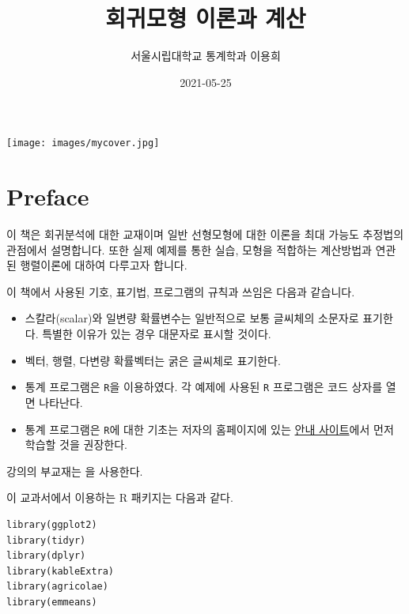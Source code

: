 \documentclass[
  10pt,
]{book}
\title{회귀모형 이론과 계산}
\author{서울시립대학교 통계학과 이용희}
\date{2021-05-25}
\makeatletter
\providecommand{\tightlist}{%
  \setlength{\itemsep}{0pt}\setlength{\parskip}{0pt}}
\newenvironment{kframe}{%
\medskip{}
\setlength{\fboxsep}{.8em}
 \def\at@end@of@kframe{}%
 \ifinner\ifhmode%
  \def\at@end@of@kframe{\end{minipage}}%
  \begin{minipage}{\columnwidth}%
 \fi\fi%
 \def\FrameCommand##1{\hskip\@totalleftmargin \hskip-\fboxsep
 \colorbox{shadecolor}{##1}\hskip-\fboxsep
     \hskip-\linewidth \hskip-\@totalleftmargin \hskip\columnwidth}%
 \MakeFramed {\advance\hsize-\width
   \@totalleftmargin\z@ \linewidth\hsize
   \@setminipage}}%
 {\par\unskip\endMakeFramed%
 \at@end@of@kframe}
\newenvironment{rmdblock}[1]
  {
  \begin{itemize}
  \renewcommand{\labelitemi}{
    \raisebox{-.7\height}[0pt][0pt]{
      {\setkeys{Gin}{width=3em,keepaspectratio}\texttt{[image: images/\#1]}}
    }
  }
  \setlength{\fboxsep}{1em}
  \begin{kframe}
  \item
  }
  {
  \end{kframe}
  \end{itemize}
  }
\newenvironment{rmdimportant}
  {\begin{rmdblock}{important}}
  {\end{rmdblock}}
\theoremstyle{definition}
\theoremstyle{definition}
\theoremstyle{definition}
\theoremstyle{definition}
\theoremstyle{remark}
\makeatother
\begin{document}
\maketitle

\thispagestyle{empty}
\begin{center}
\texttt{[image: images/mycover.jpg]}
\end{center}

\setlength{\abovedisplayskip}{-5pt}
\setlength{\abovedisplayshortskip}{-5pt}

{
\hypersetup{linkcolor=}
\setcounter{tocdepth}{1}
\tableofcontents
}
\listoftables
\listoffigures
\hypertarget{preface}{%
\chapter*{Preface}\label{preface}}


이 책은 회귀분석에 대한 교재이며 일반 선형모형에 대한 이론을 최대 가능도 추정법의 관점에서 설명합니다. 또한 실제 예제를 통한 실습, 모형을 적합하는 계산방법과 연관된 행렬이론에 대하여 다루고자 합니다.

\begin{rmdimportant}
이 책에서 사용된 기호, 표기법, 프로그램의 규칙과 쓰임은 다음과 같습니다.

\begin{itemize}
\tightlist
\item
  스칼라(scalar)와 일변량 확률변수는 일반적으로 보통 글씨체의 소문자로 표기한다. 특별한 이유가 있는 경우 대문자로 표시할 것이다.
\item
  벡터, 행렬, 다변량 확률벡터는 굵은 글씨체로 표기한다.
\item
  통계 프로그램은 \texttt{R}을 이용하였다. 각 예제에 사용된 \texttt{R} 프로그램은 코드 상자를 열면 나타난다.
\item
  통계 프로그램은 \texttt{R}에 대한 기초는 저자의 홈페이지에 있는 \href{https://ilovedata.github.io/computing/}{안내 사이트}에서 먼저 학습할 것을 권장한다.
\end{itemize}
\end{rmdimportant}

강의의 부교재는 \citet{kang2016you} 을 사용한다.

이 교과서에서 이용하는 R 패키지는 다음과 같다.

\begin{verbatim}
library(ggplot2)
library(tidyr)
library(dplyr)
library(kableExtra)
library(agricolae)
library(emmeans)
\end{verbatim}
\end{document}
